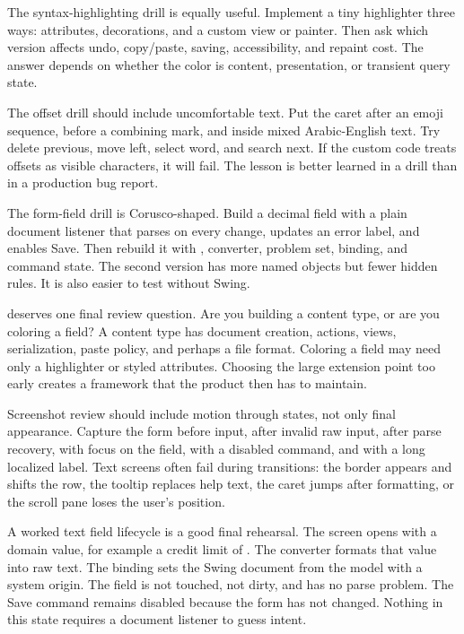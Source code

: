The syntax-highlighting drill is equally useful. Implement a tiny highlighter three ways:  attributes,  decorations, and a custom view or painter. Then ask which version affects undo, copy/paste, saving, accessibility, and repaint cost. The answer depends on whether the color is content, presentation, or transient query state.

The offset drill should include uncomfortable text. Put the caret after an emoji sequence, before a combining mark, and inside mixed Arabic-English text. Try delete previous, move left, select word, and search next. If the custom code treats offsets as visible characters, it will fail. The lesson is better learned in a drill than in a production bug report.

The form-field drill is Corusco-shaped. Build a decimal field with a plain document listener that parses on every change, updates an error label, and enables Save. Then rebuild it with , converter, problem set, binding, and command state. The second version has more named objects but fewer hidden rules. It is also easier to test without Swing.

 deserves one final review question. Are you building a content type, or are you coloring a field? A content type has document creation, actions, views, serialization, paste policy, and perhaps a file format. Coloring a field may need only a highlighter or styled attributes. Choosing the large extension point too early creates a framework that the product then has to maintain.

Screenshot review should include motion through states, not only final appearance. Capture the form before input, after invalid raw input, after parse recovery, with focus on the field, with a disabled command, and with a long localized label. Text screens often fail during transitions: the border appears and shifts the row, the tooltip replaces help text, the caret jumps after formatting, or the scroll pane loses the user's position.

A worked text field lifecycle is a good final rehearsal. The screen opens with
a domain value, for example a credit limit of . The converter
formats that value into raw text. The binding sets the Swing document from the
model with a system origin. The field is not touched, not dirty, and has no
parse problem. The Save command remains disabled because the form has not
changed. Nothing in this state requires a document listener to guess intent.

